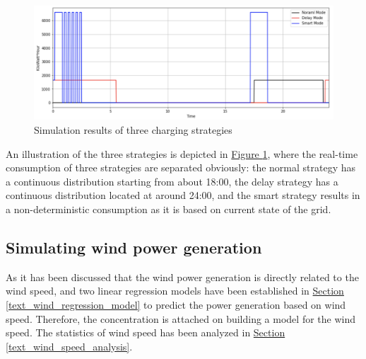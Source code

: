 \documentclass[12pt,a4paper]{report}
\begin{document}
                \begin{figure}[ht]
                    \centerline{\includegraphics[scale=0.23]{simu_three_mode}}
                    \caption{Simulation results of three charging strategies}
                    \label{fig_simu_three_mode}
                \end{figure}

                An illustration of the three strategies is depicted in \hyperref[fig_simu_three_mode]{Figure \ref*{fig_simu_three_mode}}, where the real-time consumption of three strategies are separated obviously: the normal strategy has a continuous distribution starting from about 18:00, the delay strategy has a continuous distribution located at around 24:00, and the smart strategy results in a non-deterministic consumption as it is based on current state of the grid.
                \subsection{Simulating wind power generation}
                As it has been discussed that the wind power generation is directly related to the wind speed, and two linear regression models have been established in \hyperref[text_wind_regression_model]{Section \ref*{text_wind_regression_model}} to predict the power generation based on wind speed. Therefore, the concentration is attached on building a model for the wind speed. The statistics of wind speed has been analyzed in \hyperref[text_wind_speed_analysis]{Section \ref*{text_wind_speed_analysis}}. 
                
\end{document}
